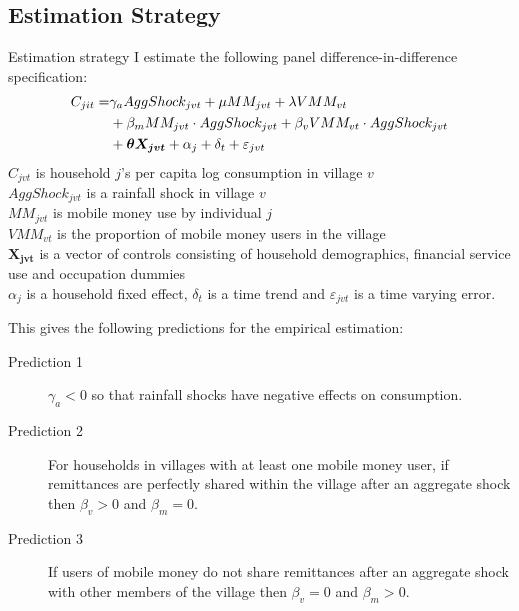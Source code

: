 \documentclass[t]{beamer}
\begin{document}
\subsection*{Estimation Strategy}
\begin{frame}[allowframebreaks]{Estimation strategy}
I estimate the following panel difference-in-difference specification:
\begin{align} \label{eq: specification agg shock}
C_{jit} = &  \gamma_a AggShock_{jvt} + \mu MM_{jvt}   +\lambda VMM_{vt}  \notag \\
&  + \beta_m MM_{jvt}\cdot AggShock_{jvt} +\beta_v VMM_{vt}\cdot AggShock_{jvt} \notag \\
& + \bm{\theta X_{jvt}} +  \alpha_j + \delta_t + \varepsilon_{jvt} 
\end{align}
$C_{jvt}$ is household $j$'s per capita log consumption in village $v$ \\
$AggShock_{jvt}$ is a rainfall shock in village $v$ \\
$MM_{jvt}$ is mobile money use by individual $j$ \\
$VMM_{vt}$ is the proportion of mobile money users in the village \\
$\bm{X_{jvt}}$ is a vector of controls consisting of household demographics, financial service use and occupation dummies \\
$\alpha_j$ is a household fixed effect, $\delta_t$ is a time trend and $\varepsilon_{jvt}$ is a time varying error. 

\framebreak
This gives the following predictions for the empirical estimation:
\begin{description}
\item[Prediction 1] $\gamma_a<0$ so that rainfall shocks have negative effects on consumption.
\item [Prediction 2] For households in villages with at least one mobile money user, if remittances are perfectly shared within the village after an aggregate shock then  $\beta_v >0$ and $\beta_m=0$. 
\item [Prediction 3] If users of mobile money do not share remittances after an aggregate shock with other members of the village then $\beta_v=0$ and $\beta_m>0$.
\end{description}

\end{frame}
\end{document}

